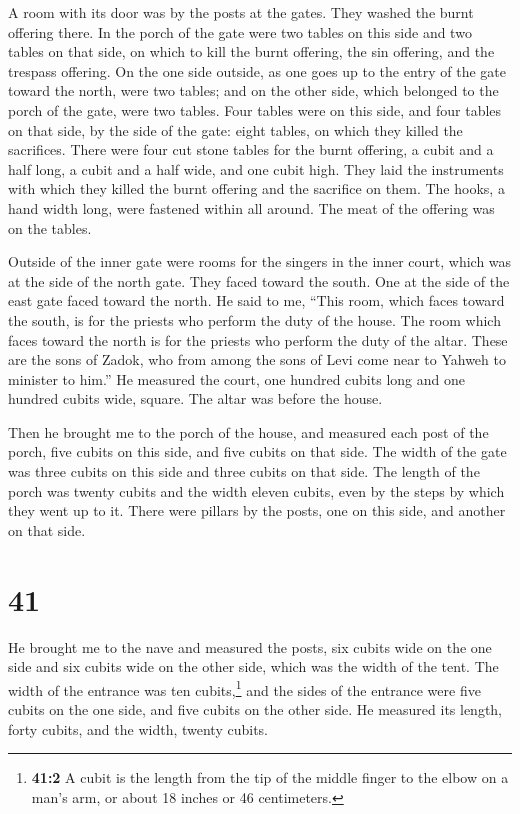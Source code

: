  A room with its door was by the posts at the gates. They
washed the burnt offering there.  In the porch of the
gate were two tables on this side and two tables on that side, on which
to kill the burnt offering, the sin offering, and the trespass offering.
 On the one side outside, as one goes up to the entry of
the gate toward the north, were two tables; and on the other side, which
belonged to the porch of the gate, were two tables.  Four
tables were on this side, and four tables on that side, by the side of
the gate: eight tables, on which they killed the sacrifices.
 There were four cut stone tables for the burnt offering,
a cubit and a half long, a cubit and a half wide, and one cubit high.
They laid the instruments with which they killed the burnt offering and
the sacrifice on them.  The hooks, a hand width long,
were fastened within all around. The meat of the offering was on the
tables.

 Outside of the inner gate were rooms for the singers in
the inner court, which was at the side of the north gate. They faced
toward the south. One at the side of the east gate faced toward the
north.  He said to me, ``This room, which faces toward
the south, is for the priests who perform the duty of the house.
 The room which faces toward the north is for the priests
who perform the duty of the altar. These are the sons of Zadok, who from
among the sons of Levi come near to Yahweh to minister to him.''
 He measured the court, one hundred cubits long and one
hundred cubits wide, square. The altar was before the house.

 Then he brought me to the porch of the house, and
measured each post of the porch, five cubits on this side, and five
cubits on that side. The width of the gate was three cubits on this side
and three cubits on that side.  The length of the porch
was twenty cubits and the width eleven cubits, even by the steps by
which they went up to it. There were pillars by the posts, one on this
side, and another on that side.

\hypertarget{section-39}{%
\section{41}\label{section-39}}

 He brought me to the nave and measured the posts, six
cubits wide on the one side and six cubits wide on the other side, which
was the width of the tent.  The width of the entrance was
ten cubits,\footnote{\textbf{41:2} A cubit is the length from the tip of
  the middle finger to the elbow on a man's arm, or about 18 inches or
  46 centimeters.} and the sides of the entrance were five cubits on the
one side, and five cubits on the other side. He measured its length,
forty cubits, and the width, twenty cubits.


